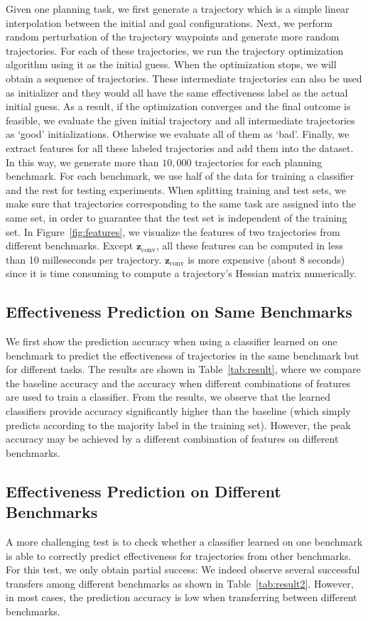 \documentclass[letterpaper, 10 pt, conference]{ieeeconf}  %
\newcommand{\fconv}{\mbox{$\mathbf z_{\text{conv}}$}}
\begin{document}
Given one planning task, we first generate a trajectory which is a simple linear interpolation between the initial and goal configurations. Next, we perform random perturbation of the trajectory waypoints and generate more random trajectories. For each of these trajectories, we run the trajectory optimization algorithm using it as the initial guess. When the optimization stops, we will obtain a sequence of trajectories. These intermediate trajectories can also be used as initializer and they would all have the same effectiveness label as the actual initial guess. As a result, if the optimization converges and the final outcome is feasible, we evaluate the given initial trajectory and all intermediate trajectories as `good' initializations. Otherwise we evaluate all of them as `bad'. Finally, we extract features for all these labeled trajectories and add them into the dataset. In this way, we generate more than $10,000$ trajectories for each planning benchmark. For each benchmark, we use half of the data for training a classifier and the rest for testing experiments. When splitting training and test sets, we make sure that trajectories corresponding to the same task are assigned into the same set, in order to guarantee that the test set is independent of the training set. In Figure~\ref{fig:features}, we visualize the features of two trajectories from different benchmarks. Except $\fconv$, all these features can be computed in less than 10 milleseconds per trajectory. $\fconv$ is more expensive (about 8 seconds) since it is time consuming to compute a trajectory's Hessian matrix numerically.

\subsection{Effectiveness Prediction on Same Benchmarks}
We first show the prediction accuracy when using a classifier learned on one benchmark to predict the effectiveness of trajectories in the same benchmark but for different tasks. The results are shown in Table~\ref{tab:result}, where we compare the baseline accuracy and the accuracy when different combinations of features are used to train a classifier. From the results, we observe that the learned classifiers provide accuracy significantly higher than the baseline (which simply predicts according to the majority label in the training set). However, the peak accuracy may be achieved by a different combination of features on different benchmarks.


\subsection{Effectiveness Prediction on Different Benchmarks}
A more challenging test is to check whether a classifier learned on one benchmark is able to correctly predict effectiveness for trajectories from other benchmarks. For this test, we only obtain partial success: We indeed observe several successful transfers among different benchmarks as shown in Table~\ref{tab:result2}. However, in most cases, the prediction accuracy is low when transferring between different benchmarks.
\end{document}
